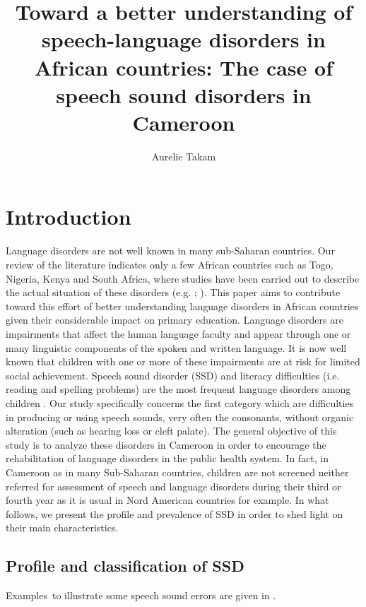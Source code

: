 \documentclass[output=paper,newtxmath,modfonts,nonflat,draftmode]{langsci/langscibook}
\author{Aurelie Takam\affiliation{Department of African Languages and Linguistics, University of Yaoundé\newline Department of French studies, York University}}
\title{Toward a better understanding of speech-language disorders in African countries: The case of speech sound disorders in Cameroon}
\begin{document}
 
\maketitle


\section{Introduction} %

Language disorders are not well known in many sub-Saharan countries. Our review of the literature indicates only a few African countries such as Togo, Nigeria, Kenya and South Africa, where studies have been carried out to describe the actual situation of these disorders (e.g. \citealt{Van2016}; \citealt{Topouzkhanian2013}). This paper aims to contribute toward this effort of better understanding language disorders in African countries given their considerable impact on primary education. Language disorders are impairments that affect the human language faculty and appear through one or many linguistic components of the spoken and written language. It is now well known that children with one or more of these impairments are at risk for limited social achievement. Speech sound disorder (SSD) and literacy difficulties (i.e. reading and spelling problems) are the most frequent language disorders among children \citep{Ruscello1991}. Our study specifically concerns the first category which are difficulties in producing or using speech sounds, very often the consonants, without organic alteration (such as hearing loss or cleft palate). The general objective of this study is to analyze these disorders in Cameroon in order to encourage the rehabilitation of language disorders in the public health system. In fact, in Cameroon as in many Sub-Saharan countries, children are not screened neither referred for assessment of speech and language disorders during their third or fourth year as it is usual in Nord American countries for example. In what follows, we present the profile and prevalence of SSD in order to shed light on their main characteristics. 

\subsection{Profile and classification of SSD} %

Examples~to illustrate some speech sound errors are given in .
\end{document}
